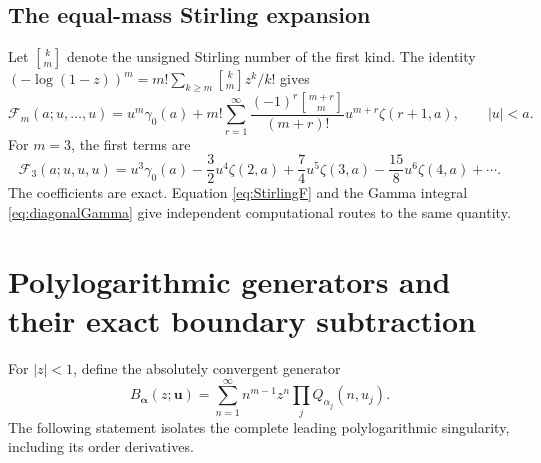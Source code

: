 \documentclass[11pt]{article}
\numberwithin{equation}{section}
\theoremstyle{definition}\newtheorem{definition}[theorem]{Definition}
\theoremstyle{remark}\newtheorem{remark}[theorem]{Remark}
\newcommand{\bu}{\boldsymbol{u}}
\newcommand{\ba}{\boldsymbol{\alpha}}
\newcommand{\cF}{\mathcal F}
\newcommand{\stirling}[2]{\genfrac{[}{]}{0pt}{}{#1}{#2}}
\begin{document}
\subsection{The equal-mass Stirling expansion}
Let $\stirling{k}{m}$ denote the unsigned Stirling number of the first kind. The identity
$(-\log(1-z))^m=m!\sum_{k\ge m}\stirling{k}{m}z^k/k!$ gives
\begin{equation}\label{eq:StirlingF}
 \cF_m(a;u,\ldots,u)
 =u^m\gamma_0(a)+m!\sum_{r=1}^{\infty}
 \frac{(-1)^r\stirling{m+r}{m}}{(m+r)!}
 u^{m+r}\zeta(r+1,a),\qquad |u|<a.
\end{equation}
For $m=3$, the first terms are
\begin{equation}\label{eq:F3series}
 \cF_3(a;u,u,u)
 =u^3\gamma_0(a)-\frac32u^4\zeta(2,a)
 +\frac74u^5\zeta(3,a)-\frac{15}{8}u^6\zeta(4,a)+\cdots.
\end{equation}
The coefficients are exact. Equation \eqref{eq:StirlingF} and the Gamma integral \eqref{eq:diagonalGamma} give independent computational routes to the same quantity.

\section{Polylogarithmic generators and their exact boundary subtraction}
For $|z|<1$, define the absolutely convergent generator
\begin{equation}\label{eq:Balpha}
 B_{\ba}(z;\bu)=\sum_{n=1}^{\infty}n^{m-1}z^n
                \prod_jQ_{\alpha_j}(n,u_j).
\end{equation}
The following statement isolates the complete leading polylogarithmic singularity, including its order derivatives.
\end{document}
